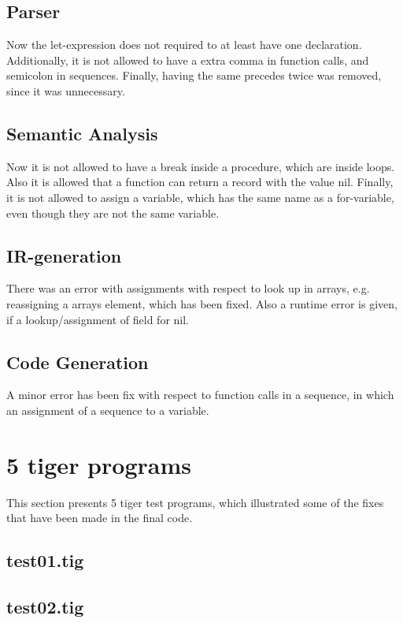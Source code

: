 \documentclass{article}
\begin{document}
\subsection{Parser}
Now the let-expression does not required to at least have one declaration. Additionally, it is not allowed to have a extra comma in function calls, and semicolon in sequences. Finally, having the same precedes twice was removed, since it was unnecessary. 

\subsection{Semantic Analysis}
Now it is not allowed to have a break inside a procedure, which are inside loops. Also it is allowed that a function can return a record with the value nil. Finally, it is not allowed to assign a variable, which has the same name as a for-variable, even though they are not the same variable. 

\subsection{IR-generation}
There was an error with assignments with respect to look up in arrays, e.g. reassigning a arrays element, which has been fixed. Also a runtime error is given, if a lookup/assignment of field for nil. 

\subsection{Code Generation}
A minor error has been fix with respect to function calls in a sequence, in which an assignment of a sequence to a variable. 

\section{5 tiger programs}
This section presents 5 tiger test programs, which illustrated some of the fixes that have been made in the final code.

\subsection{test01.tig}



\subsection{test02.tig}
\end{document}
